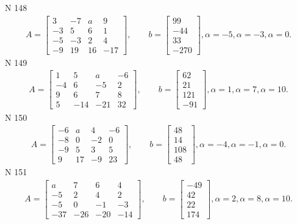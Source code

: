 \documentclass[11pt]{report}
\begin{document}
N 148
\begin{align*}
 A = \left[\begin{matrix}3 & -7 & a & 9\\-3 & 5 & 6 & 1\\-5 & -3 & 2 & 4\\-9 & 19 & 16 & -17\end{matrix}\right],
    \qquad b = \left[\begin{matrix}99\\-44\\33\\-270\end{matrix}\right], \alpha = -5, \alpha = -3, \alpha = 0. 
 \end{align*}
N 149
\begin{align*}
 A = \left[\begin{matrix}1 & 5 & a & -6\\-4 & 6 & -5 & 2\\9 & 6 & 7 & 8\\5 & -14 & -21 & 32\end{matrix}\right],
    \qquad b = \left[\begin{matrix}62\\21\\121\\-91\end{matrix}\right], \alpha = 1, \alpha = 7, \alpha = 10. 
 \end{align*}
N 150
\begin{align*}
 A = \left[\begin{matrix}-6 & a & 4 & -6\\-8 & 0 & -2 & 0\\-9 & 5 & 3 & 5\\9 & 17 & -9 & 23\end{matrix}\right],
    \qquad b = \left[\begin{matrix}48\\14\\108\\48\end{matrix}\right], \alpha = -4, \alpha = -1, \alpha = 0. 
 \end{align*}
N 151
\begin{align*}
 A = \left[\begin{matrix}a & 7 & 6 & 4\\-5 & 2 & 4 & 2\\-5 & 0 & -1 & -3\\-37 & -26 & -20 & -14\end{matrix}\right],
    \qquad b = \left[\begin{matrix}-49\\42\\22\\174\end{matrix}\right], \alpha = 2, \alpha = 8, \alpha = 10. 
 \end{align*}
\end{document}
